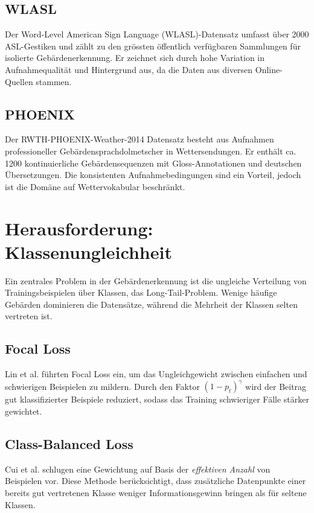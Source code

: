 \subsection{WLASL}
Der Word-Level American Sign Language (WLASL)-Datensatz \cite{li2020wlasl} umfasst über 2000 ASL-Gestiken und zählt zu den grössten öffentlich verfügbaren Sammlungen für isolierte Gebärdenerkennung. Er zeichnet sich durch hohe Variation in Aufnahmequalität und Hintergrund aus, da die Daten aus diversen Online-Quellen stammen.

\subsection{PHOENIX}
Der RWTH-PHOENIX-Weather-2014 Datensatz \cite{koller2015phoenix, camgoz2018neural} besteht aus Aufnahmen professioneller Gebärdensprachdolmetscher in Wettersendungen. Er enthält ca. 1200 kontinuierliche Gebärdensequenzen mit Gloss-Annotationen und deutschen Übersetzungen. Die konsistenten Aufnahmebedingungen sind ein Vorteil, jedoch ist die Domäne auf Wettervokabular beschränkt.

\section{Herausforderung: Klassenungleichheit}
Ein zentrales Problem in der Gebärdenerkennung ist die ungleiche Verteilung von Trainingsbeispielen über Klassen, das Long-Tail-Problem. Wenige häufige Gebärden dominieren die Datensätze, während die Mehrheit der Klassen selten vertreten ist.

\subsection{Focal Loss}
Lin et al. \cite{lin2017focal} führten Focal Loss ein, um das Ungleichgewicht zwischen einfachen und schwierigen Beispielen zu mildern. Durch den Faktor $(1-p_t)^\gamma$ wird der Beitrag gut klassifizierter Beispiele reduziert, sodass das Training schwieriger Fälle stärker gewichtet.

\subsection{Class-Balanced Loss}
Cui et al. \cite{cui2019classbalanced} schlugen eine Gewichtung auf Basis der \textit{effektiven Anzahl} von Beispielen vor. Diese Methode berücksichtigt, dass zusätzliche Datenpunkte einer bereits gut vertretenen Klasse weniger Informationsgewinn bringen als für seltene Klassen.

